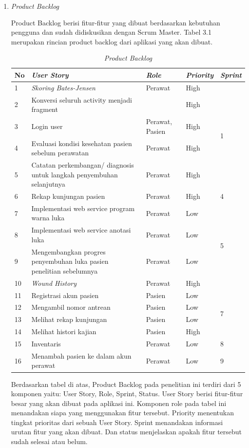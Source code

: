 \begin{enumerate}
\item \textit{Product Backlog}

Product Backlog berisi fitur-fitur yang dibuat berdasarkan kebutuhan pengguna dan sudah didiskusikan dengan Scrum Master. Tabel 3.1 merupakan rincian product backlog dari aplikasi yang akan dibuat.

\begin{table}[H]
	\caption{\textit{Product Backlog}}
	\label{product_backlog}
	\begin{tabular}{@{} |p{0.5cm}|p{7cm}|p{1.5cm}|p{2cm}|p{2cm}| @{}}
		\hline
		\textbf{No} & \textbf{\textit{User Story}} & \textbf{\textit{Role}} & \textbf{\textit{Priority}} & \textbf{\textit{Sprint}} \\
		\hline
		1 & \textit{Skoring Bates-Jensen} & Perawat & High & \multirow{5}{2cm}{1} \\
		\cline{1-4}
		2 & Konversi seluruh activity menjadi fragment & & High &  \\
		\cline{1-4}
		3 & Login user & Perawat, Pasien & High &  \\
		\hline
		4 & Evaluasi kondisi kesehatan pasien sebelum perawatan & Perawat & High & 2 \\
		\hline
		5 & Catatan perkembangan/ diagnosis untuk langkah penyembuhan selanjutnya & Perawat & High & 3 \\
		\hline
		6 & Rekap kunjungan pasien & Perawat & High & 4 \\
		\hline
		7 & Implementasi web service program warna luka & Perawat & Low & \multirow{4}{2cm}{5} \\
		\cline{1-4}
		8 & Implementasi web service anotasi luka & Perawat & Low &  \\
		\cline{1-4}
		9 & Mengembangkan progres penyembuhan luka pasien penelitian sebelumnya & Perawat & Low &  \\
		\hline
		10 & \textit{Wound History} & Perawat & High & 6 \\
		\hline
		11 & Registrasi akun pasien & Pasien & Low & \multirow{4}{2cm}{7} \\
		\cline{1-4}
		12 & Mengambil nomor antrean & Pasien & Low &  \\
		\cline{1-4}
		13 & Melihat rekap kunjungan & Pasien & Low &  \\
		\cline{1-4}
		14 & Melihat histori kajian & Pasien & High &  \\
		\hline
		15 & Inventaris & Perawat & Low & 8 \\
		\hline
		16 & Menambah pasien ke dalam akun perawat & Perawat & Low & 9 \\
		\hline
	\end{tabular}
\end{table}
Berdasarkan tabel di atas, Product Backlog pada penelitian ini terdiri dari 5 komponen yaitu: User Story, Role, Sprint, Status. User Story berisi fitur-fitur besar yang akan dibuat pada aplikasi ini. Komponen role pada tabel ini menandakan siapa yang menggunakan fitur tersebut. Priority menentukan tingkat prioritas dari sebuah User Story. Sprint menandakan informasi urutan fitur yang akan dibuat. Dan status menjelaskan apakah fitur tersebut sudah selesai atau belum.


\end{enumerate}
